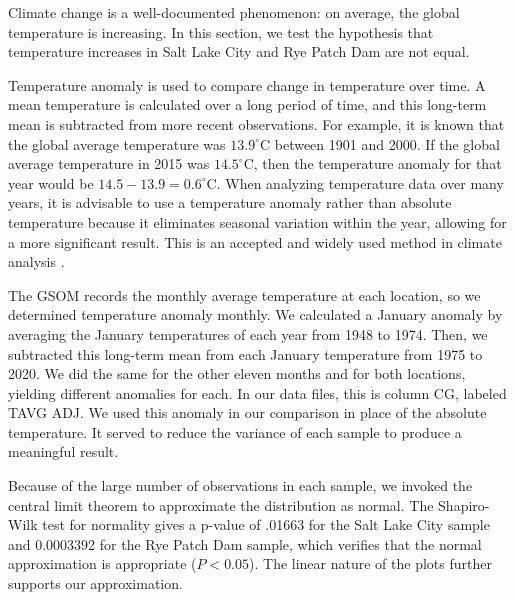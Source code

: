 Climate change is a well-documented phenomenon: on average, the global temperature is increasing. In this section, we test the hypothesis that temperature increases in Salt Lake City and Rye Patch Dam are not equal.

Temperature anomaly is used to compare change in temperature over time. A mean temperature is calculated over a long period of time, and this long-term mean is subtracted from more recent observations. For example, it is known that the global average temperature was $13.9^{\circ}$C between 1901 and 2000. If the global average temperature in 2015 was $14.5^{\circ}$C, then the temperature anomaly for that year would be $14.5 - 13.9 = 0.6^{\circ}$C. When analyzing temperature data over many years, it is advisable to use a temperature anomaly rather than absolute temperature because it eliminates seasonal variation within the year, allowing for a more significant result. This is an accepted and widely used method in climate analysis \cite{temp_anomaly}.

The GSOM records the monthly average temperature at each location, so we determined temperature anomaly monthly. We calculated a January anomaly by averaging the January temperatures of each year from 1948 to 1974. Then, we subtracted this long-term mean from each January temperature from 1975 to 2020. We did the same for the other eleven months and for both locations, yielding different anomalies for each. In our data files, this is column CG, labeled TAVG ADJ. We used this anomaly in our comparison in place of the absolute temperature. It served to reduce the variance of each sample to produce a meaningful result.

Because of the large number of observations in each sample, we invoked the central limit theorem to approximate the distribution as normal. The Shapiro-Wilk test for normality gives a p-value of .01663 for the Salt Lake City sample and 0.0003392 for the Rye Patch Dam sample, which verifies that the normal approximation is appropriate ($P < 0.05$). The linear nature of the plots further supports our approximation.

